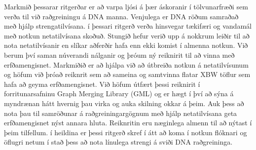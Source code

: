 \documentclass[a4paper,12pt,twoside,BCOR=10mm]{scrbook}
\def\thesisauthor{Tom Willy Schiller}			%
\begin{document}
Markmið þessarar ritgerðar er að varpa ljósi á þær áskoranir í tölvunarfræði sem verða til við raðgreiningu á DNA manna. Venjulega er DNA röðum samraðað með hjálp strengatilvísana. í þessari ritgerð verða hinsvegar tækifæri og vandamál með notkun netatilvísana skoðuð.
Stungið hefur verið upp á nokkrum leiðir til að nota netatilvísanir en slíkar aðferðir hafa enn ekki komist í almenna notkun. Við berum því saman núverandi nálganir og þróum ný reiknirit til að vinna með erfðamengisnet.
Markmiðið er að hjálpa við að útbreiða notkun á netatilvísunum og höfum við þróað reiknrit sem að sameina og samtvinna flatar XBW töflur sem hafa að geyma erfðamengisnet. Við höfum útfært þessi reiknirit í forritunarsafninu Graph Merging Library (GML) og er hægt í því að sýna á myndrænan hátt hvernig þau virka og auka skilning okkar á þeim. Auk þess að nota þau til samröðunar á raðgreiningargögnum með hjálp netatilvísana geta erfðamengisnet nýst annara hluta. Reiknritin eru næginlega almenn til að nýtast í þeim tilfellum.
í heildina er þessi ritgerð skref í átt að koma í notkun flóknari og öflugri netum í stað þess að nota línulega strengi á sviði DNA raðgreininga.


\newpage

%
%
%
%
%
\end{document}
